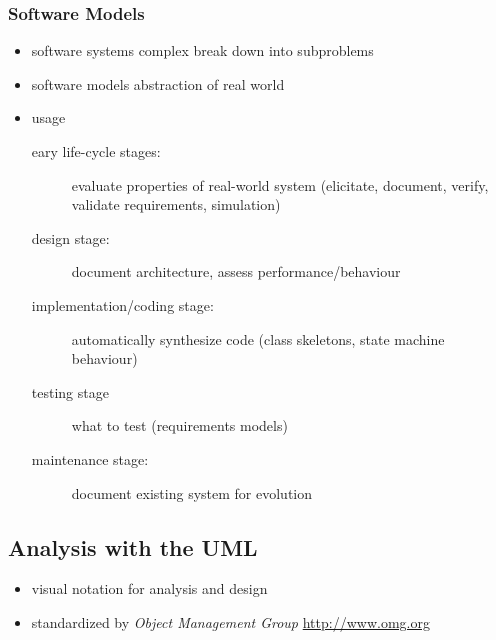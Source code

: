 \documentclass[a4paper, 10pt]{article}
\begin{document}
\subsubsection{Software Models}
\begin{itemize}
	\item software systems complex \follows break down into subproblems
	\item software models \follows abstraction of real world
	\item usage
		\begin{description}
			\item[eary life-cycle stages:] evaluate properties of real-world system (elicitate, document, verify, validate requirements, simulation)
			\item[design stage:] document architecture, assess performance/behaviour
			\item[implementation/coding stage:] automatically synthesize code (class skeletons, state machine behaviour)
			\item[testing stage] what to test (requirements models)
			\item[maintenance stage:] document existing system for evolution
		\end{description}
\end{itemize}

\subsection*{Analysis with the UML}
\begin{itemize}
	\item visual notation for analysis and design
	\item standardized by \emph{Object Management Group} \url{http://www.omg.org}
\end{itemize}
\end{document}
